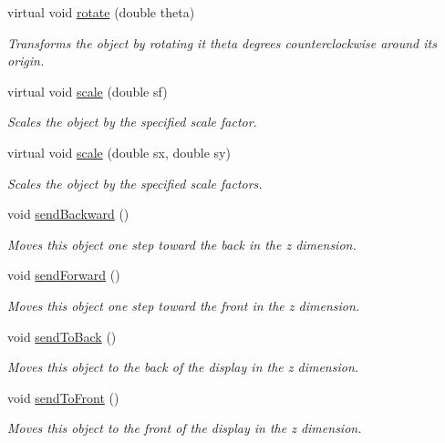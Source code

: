 \begin{DoxyCompactItemize}
virtual void \mbox{\hyperlink{classsgl_1_1GObject_ae1ffaa12185dfd5ba464f7d87c329e26}{rotate}} (double theta)
\begin{DoxyCompactList}\small\item\em Transforms the object by rotating it {\ttfamily theta} degrees counterclockwise around its origin. \end{DoxyCompactList}\item 
virtual void \mbox{\hyperlink{classsgl_1_1GObject_ad2e1900f730475c2d044817db03b38d6}{scale}} (double sf)
\begin{DoxyCompactList}\small\item\em Scales the object by the specified scale factor. \end{DoxyCompactList}\item 
virtual void \mbox{\hyperlink{classsgl_1_1GObject_a63641f69d610d0b951357d35a0c3b1e3}{scale}} (double sx, double sy)
\begin{DoxyCompactList}\small\item\em Scales the object by the specified scale factors. \end{DoxyCompactList}\item 
void \mbox{\hyperlink{classsgl_1_1GObject_ab6747f40313c531c2db32edb5b63b9b7}{send\+Backward}} ()
\begin{DoxyCompactList}\small\item\em Moves this object one step toward the back in the {\itshape z} dimension. \end{DoxyCompactList}\item 
void \mbox{\hyperlink{classsgl_1_1GObject_a710b3e449c9facba7847c91ab170d281}{send\+Forward}} ()
\begin{DoxyCompactList}\small\item\em Moves this object one step toward the front in the {\itshape z} dimension. \end{DoxyCompactList}\item 
void \mbox{\hyperlink{classsgl_1_1GObject_a0f7f1efbb7fd46dde2867c4ad0330896}{send\+To\+Back}} ()
\begin{DoxyCompactList}\small\item\em Moves this object to the back of the display in the {\itshape z} dimension. \end{DoxyCompactList}\item 
void \mbox{\hyperlink{classsgl_1_1GObject_aee33d68488e46827ef55fac07f40a9b2}{send\+To\+Front}} ()
\begin{DoxyCompactList}\small\item\em Moves this object to the front of the display in the {\itshape z} dimension. \end{DoxyCompactList}\item 

\end{DoxyCompactItemize}
